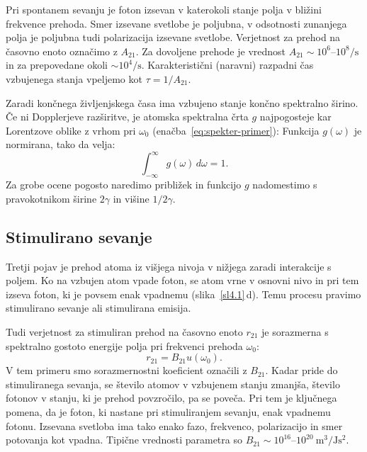 Pri spontanem sevanju je foton izsevan v katerokoli stanje polja v bližini 
frekvence prehoda. Smer izsevane svetlobe je poljubna, v odsotnosti zunanjega polja
je poljubna tudi polarizacija izsevane svetlobe.
Verjetnost za prehod na časovno enoto označimo z $A_{21}$.
Za dovoljene prehode je vrednost $A_{21} \sim 10^6$--$10^8/\si{\second}$ in 
za prepovedane okoli $\sim 10^4/\si{\second}$. Karakteristični (naravni) 
razpadni čas vzbujenega stanja vpeljemo kot
$\tau = 1/A_{21}$. 

Zaradi končnega življenjskega časa ima vzbujeno stanje končno spektralno 
širino. Če ni Dop\-pler\-je\-ve razširitve, je atomska spektralna 
črta $g$  najpogosteje kar 
Lorentzove oblike z vrhom pri $\omega_0$
(enačba~\ref{eq:spekter-primer}):
Funkcija $g(\omega)$ je normirana, tako da velja:
\begin{equation}
\int_{-\infty}^\infty g(\omega)\, d\omega=1.
\label{4.20}
\end{equation}
Za grobe ocene pogosto naredimo približek in funkcijo $g$ nadomestimo 
s pravokotnikom širine
$2\gamma$ in višine $1/2\gamma$.

\subsection*{Stimulirano sevanje}
Tretji pojav je prehod atoma iz višjega nivoja v nižjega zaradi interakcije
s poljem. Ko na vzbujen atom vpade foton, se atom vrne v osnovni nivo in pri 
tem izseva foton, ki je povsem enak vpadnemu (slika~\ref{sl4.1}\,d). 
Temu procesu pravimo stimulirano sevanje ali 
stimulirana emisija.

Tudi verjetnost za stimuliran prehod na časovno enoto $r_{21}$ 
je sorazmerna s spektralno gostoto energije polja pri frekvenci prehoda $\omega_{0}$:
\begin{equation}
r_{21}=B_{21}u(\omega_{0}).
\label{4.17}
\end{equation}
V tem primeru smo sorazmernostni koeficient označili z $B_{21}$. Kadar pride do
stimuliranega sevanja, se število atomov v vzbujenem stanju zmanjša, 
število fotonov v stanju, ki je prehod povzročilo, pa se poveča. Pri tem je 
ključnega pomena, da je foton, ki nastane pri stimuliranjem sevanju, enak vpadnemu fotonu.
Izsevana svetloba ima tako enako fazo, frekvenco, polarizacijo in smer potovanja kot 
vpadna. Tipične vrednosti parametra so $B_{21} \sim 10^{16}$--$10^{20}~\si{\metre^3/\joule\second^2}$.

